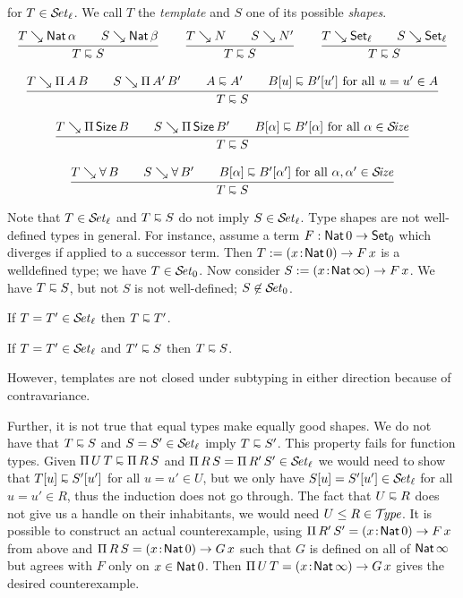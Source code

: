 \documentclass[acmlarge,review,anonymous]{acmart}\settopmatter{printfolios=true}
\begin{document}
 for $T \in \SET[\ell]$.  We call $T$ the \emph{template} and $S$ one of its possible \emph{shapes}.
\begin{gather*}
  \ru{T \evalsto \Nat \alpha \qquad
      S \evalsto \Nat \beta
    }{T \shape S}
\qquad
  \ru{T \evalsto N \qquad
      S \evalsto N'
    }{T \shape S}
\qquad
   \ru{T \evalsto \Set[\ell] \qquad
       S \evalsto \Set[\ell]
    }{T \shape S}
\\[2ex]
  \ru{T \evalsto \piT A B \qquad
      S \evalsto \piT{A'}{B'} \qquad
      A \shape A' \qquad
      B[u] \shape B'[u'] \mforall u = u' \in A
    }{T \shape S}
\\[2ex]
  \ru{T \evalsto \piT \Size B \qquad
      S \evalsto \piT{\Size}{B'} \qquad
      B[\alpha] \shape B'[\alpha] \mforall \alpha \in \SIZE
    }{T \shape S}
\\[2ex]
  \ru{T \evalsto \forallT B \qquad
      S \evalsto \forallT{B'} \qquad
      B[\alpha] \shape B'[\alpha'] \mforall \alpha,\alpha' \in \SIZE
    }{T \shape S}
\end{gather*}

Note that $T \in \SET[\ell]$ and $T \shape S$ do not imply $S \in \SET[\ell]$.
Type shapes are not well-defined types in general.
For instance, assume a term $F : \Nat 0 \to \Set[0]$ which diverges if applied to a successor term.
Then $T := \funT x {\Nat 0} {F\,x}$ is a welldefined type; we have $T \in \SET[0]$.
Now consider $S := \funT x {\Nat \infty} {F\,x}$.
We have $T \shape S$, but not $S$ is not well-defined; $S \not\in \SET[0]$.

\begin{lemma}
  If\/ $T = T' \in \SET[\ell]$ then $T \shape T'$.
\end{lemma}

\begin{lemma}
  If\/ $T = T' \in \SET[\ell]$ and $T' \shape S$ then $T \shape S$.
\end{lemma}

However, templates are not closed under subtyping in either direction because of contravariance.

Further, it is not true that equal types make equally good shapes.  We do not have that
$T \shape S$ and $S = S' \in \SET[\ell]$ imply $T \shape S'$.  This property fails for function types.
Given $\piT U T \shape \piT R S$ and $\piT R S = \piT {R'}{S'} \in \SET[\ell]$ we would need to show that $T[u] \shape S'[u']$ for all $u = u' \in U$, but we only have $S[u] = S'[u'] \in \SET[\ell]$ for all $u = u' \in R$, thus the induction does not go through.  The fact that $U \shape R$ does not give us a handle on their inhabitants, we would need $U \leq R \in \TYPE$.
It is possible to construct an actual counterexample, using
$\piT {R'} S' =  \funT x {\Nat 0} {F\,x}$ from above and $\piT R S = \funT x {\Nat 0} {G\,x}$
such that $G$ is defined on all of $\Nat \infty$ but agrees with $F$ only on $x \in \Nat 0$.
Then $\piT U T = \funT x {\Nat \infty} {G\,x}$ gives the desired counterexample.
\end{document}
